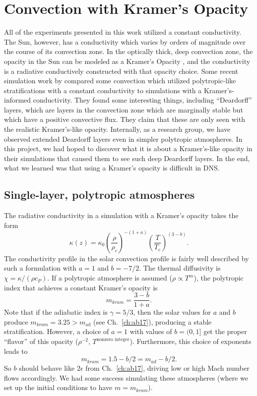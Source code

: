 \section{Convection with Kramer's Opacity}
\label{sec:kramers_opacity}
All of the experiments presented in this work utilized a constant conductivity.
The Sun, however, has a conductivity which varies by orders of magnitude over the course of its convection zone.
In the optically thick, deep convection zone, the opacity in the Sun can be modeled as a Kramer's Opacity \citep[see e.g.,][]{brandenburg2016}, and the conductivity is a radiative conductively constructed with that opacity choice.
Some recent simulation work by \citet{kapyla&all2017} compared some convection which utilized polytropic-like stratifications with a constant conductivity to simulations with a Kramer's-informed conductivity.
They found some interesting things, including ``Deardorff'' layers, which are layers in the convection zone which are marginally stable but which have a positive convective flux.
They claim that these are only seen with the realistic Kramer's-like opacity.
Internally, as a research group, we have observed extended Deardorff layers even in simpler polytropic atmospheres.
In this project, we had hoped to discover what it is about a Kramer's-like opacity in their simulations that caused them to see such deep Deardorff layers.
In the end, what we learned was that using a Kramer's opacity is difficult in DNS.

\subsection{Single-layer, polytropic atmospheres}
The radiative conductivity in a simulation with a Kramer's opacity \citep{kapyla&all2017} takes the form
$$
\kappa(z) = \kappa_0 \left(\frac{\rho}{\rho_c}\right)^{-(1+a)} \left(\frac{T}{T_c}\right)^{(3-b)}.
$$
The conductivity profile in the solar convection profile is fairly well described by such a formulation with $a = 1$ and $b = -7/2$.
The thermal diffusivity is $\chi = \kappa / (\rho c_P)$. 
If a polytropic atmosphere is assumed ($\rho \propto T^m$), the polytropic index that achieves a constant Kramer's opacity \citep{jones1976} is
$$
m_{kram} = \frac{3 - b}{1 + a}.
$$
Note that if the adiabatic index is $\gamma = 5/3$, then the solar values for $a$ and $b$ produce $m_{kram} = 3.25 > m_{\text{ad}}$ (see Ch.~\ref{ch:ab17}), producing a stable stratification.
However, a choice of $a = 1$ with values of $b = (0, 1]$ get the proper ``flavor'' of this opacity ($\rho^{-2}$, $T^{\text{nonzero integer}}$).
Furthermore, this choice of exponents leads to
\begin{equation}
m_{kram} = 1.5 - b/2 = m_{ad} - b/2.
\end{equation}
So $b$ should behave like $2\epsilon$ from Ch.~\ref{ch:ab17}, driving low or high Mach number flows accordingly.
We had some success simulating these atmospheres (where we set up the initial conditions to have $m = m_{kram}$).

